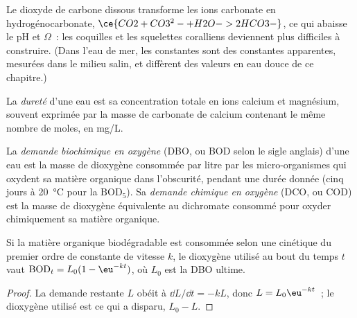 Le dioxyde de carbone dissous transforme les ions carbonate en hydrogénocarbonate, $\ce{CO2 + CO3^2- + H2O -> 2HCO3-}$,
ce qui abaisse le pH et $\Omega$~: les coquilles et les squelettes coralliens deviennent plus difficiles à construire. (Dans
l'eau de mer, les constantes sont des constantes apparentes, mesurées dans
le milieu salin, et diffèrent des valeurs en eau douce de ce chapitre.)

\begin{definition}\label{def:b3:environmental-toxicology:hardness}
La \emph{dureté} d'une eau est sa concentration totale en
ions calcium et magnésium, souvent exprimée par la masse de carbonate de
calcium contenant le même nombre de moles, en mg/L.
\end{definition}

\begin{definition}\label{def:b3:environmental-toxicology:oxygen-demand}
La \emph{demande biochimique en oxygène} (DBO, ou BOD selon le
sigle anglais) d'une eau est la masse de dioxygène consommée par litre par
les micro-organismes qui oxydent sa matière organique dans l'obscurité,
pendant une durée donnée (cinq jours à \qty{20}{\celsius} pour la $\mathrm{BOD_5}$). Sa
\emph{demande chimique en oxygène} (DCO, ou COD) est la masse de
dioxygène équivalente au dichromate consommé pour oxyder chimiquement sa
matière organique.
\end{definition}

\begin{proposition}\label{prop:b3:environmental-toxicology:bod}
Si la matière organique biodégradable est consommée selon une cinétique du
premier ordre de constante de vitesse $k$, le dioxygène utilisé au bout du temps $t$ vaut $\mathrm{BOD}_t = L_0(1 - \eu^{-kt})$, où $L_0$ est la DBO ultime.
\end{proposition}

\begin{proof}
La demande restante $L$ obéit à $\dd L/\dd t = -kL$, donc $L = L_0\eu^{-kt}$~; le dioxygène utilisé est ce qui a disparu,
$L_0 - L$.
\end{proof}

